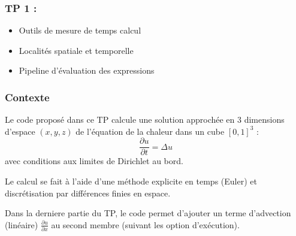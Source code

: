 \documentclass{beamer}
\begin{document}
\begin{frame}
	\frametitle{TP 1 :}
	\Large
	\begin{itemize}
		\item Outils de mesure de temps calcul
		\item Localit\'es spatiale et temporelle
		\item Pipeline d'\'evaluation des expressions
	\end{itemize}
\end{frame}

\begin{frame}
\frametitle{Contexte}
	
	Le code propos\'e dans ce TP calcule une solution approch\'ee en 3 dimensions d'espace $(x,y,z)$ de l'\'equation de la chaleur dans un cube $[0,1]^3$ :
	$$
	\frac{\partial u}{\partial t} = \Delta u
	$$
	avec conditions aux limites de Dirichlet au bord.
	\vfill
	
	Le calcul se fait \`a l'aide d'une m\'ethode explicite en temps (Euler) et discr\'etisation par diff\'erences finies en espace.
	
	\vfill
	Dans la derniere partie du TP, le code permet d'ajouter un terme d'advection (linéaire) $\frac{\displaystyle\partial u}{\displaystyle\partial x}$ au second membre (suivant les option d'ex\'ecution).
	
	\vfill
	
\end{frame}
\end{document}
